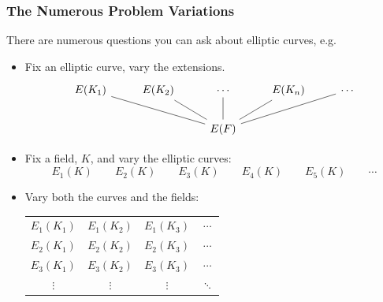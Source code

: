 \begin{frame}[plain] \frametitle{The Numerous Problem Variations} \footnotesize
There are numerous questions you can ask about elliptic curves, e.g.
\begin{itemize}
\item Fix an elliptic curve, vary the extensions.
	\[
	\begin{tikzcd}[ampersand replacement=\&]
	E(K_1) \& E(K_2) \& \cdots \& E(K_n) \& \cdots \\
	\& \& E(F) \arrow[dash]{ull} \arrow[dash]{ul} \arrow[dash]{u} \arrow[dash]{ur} \arrow[dash]{urr} \& \& 
	\end{tikzcd}
	\]

\item Fix a field, $K$, and vary the elliptic curves:
	\[
	E_1(K) \qquad E_2(K) \qquad E_3(K) \qquad E_4(K) \qquad E_5(K) \qquad \cdots 
	\]

\item Vary both the curves and the fields:
	\begin{table}[ht]
	\centering
	\begin{tabular}{cccc}
	$E_1(K_1)$ & $E_1(K_2)$ & $E_1(K_3)$ & $\cdots$ \\
	$E_2(K_1)$ & $E_2(K_2)$ & $E_2(K_3)$ & $\cdots$ \\
	$E_3(K_1)$ & $E_3(K_2)$ & $E_3(K_3)$ & $\cdots$ \\
	$\vdots$ & $\vdots$ & $\vdots$ & $\ddots$
	\end{tabular}
	\end{table}
\end{itemize}
\end{frame}



